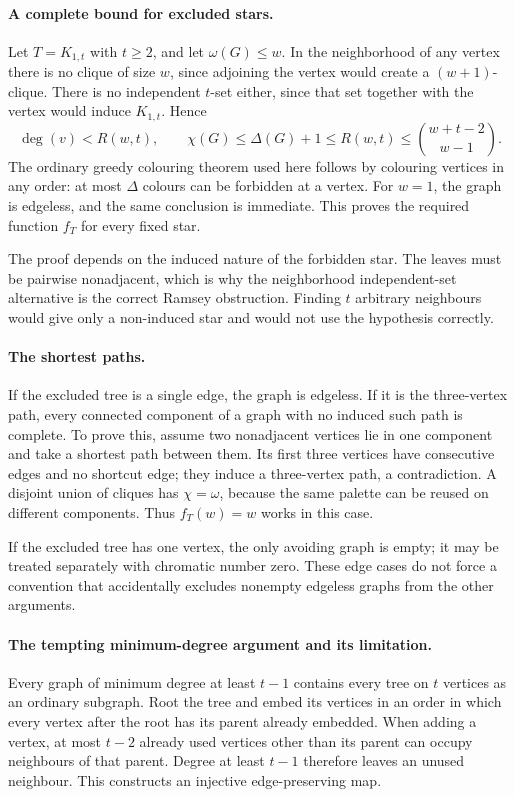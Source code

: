 \documentclass[11pt,a4paper]{article}
\begin{document}
\paragraph{A complete bound for excluded stars.}
Let $T=K_{1,t}$ with $t\ge2$, and let $\omega(G)\le w$. In the neighborhood of any vertex there is no clique of size $w$, since adjoining the vertex would create a $(w+1)$-clique. There is no independent $t$-set either, since that set together with the vertex would induce $K_{1,t}$. Hence
\[
\deg(v)<R(w,t),\qquad
\chi(G)\le\Delta(G)+1\le R(w,t)
\le\binom{w+t-2}{w-1}.
\]
The ordinary greedy colouring theorem used here follows by colouring vertices in any order: at most $\Delta$ colours can be forbidden at a vertex. For $w=1$, the graph is edgeless, and the same conclusion is immediate. This proves the required function $f_T$ for every fixed star.

The proof depends on the induced nature of the forbidden star. The leaves must be pairwise nonadjacent, which is why the neighborhood independent-set alternative is the correct Ramsey obstruction. Finding $t$ arbitrary neighbours would give only a non-induced star and would not use the hypothesis correctly.

\paragraph{The shortest paths.}
If the excluded tree is a single edge, the graph is edgeless. If it is the three-vertex path, every connected component of a graph with no induced such path is complete. To prove this, assume two nonadjacent vertices lie in one component and take a shortest path between them. Its first three vertices have consecutive edges and no shortcut edge; they induce a three-vertex path, a contradiction. A disjoint union of cliques has $\chi=\omega$, because the same palette can be reused on different components. Thus $f_T(w)=w$ works in this case.

If the excluded tree has one vertex, the only avoiding graph is empty; it may be treated separately with chromatic number zero. These edge cases do not force a convention that accidentally excludes nonempty edgeless graphs from the other arguments.

\paragraph{The tempting minimum-degree argument and its limitation.}
Every graph of minimum degree at least $t-1$ contains every tree on $t$ vertices as an ordinary subgraph. Root the tree and embed its vertices in an order in which every vertex after the root has its parent already embedded. When adding a vertex, at most $t-2$ already used vertices other than its parent can occupy neighbours of that parent. Degree at least $t-1$ therefore leaves an unused neighbour. This constructs an injective edge-preserving map.
\end{document}
